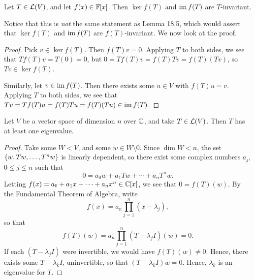 \documentclass{article}
\begin{document}
\begin{lemma}
Let $T\in\mathcal L(V)$, and let $f(x)\in \mathbb F[x]$. Then $\ker f(T)$ and $\operatorname{im} f(T)$ are $T$-invariant.
\end{lemma}
Notice that this is \textit{not} the same statement as Lemma 18.5, which would assert that $\ker f(T)$ and $\operatorname{im} f(T)$ are $f(T)$-invariant. We now look at the proof.
\begin{proof}
Pick $v\in\ker f(T)$. Then $f(T)v = 0$. Applying $T$ to both sides, we see that $Tf(T)v = T(0)= 0$, but $0=Tf(T)v = f(T)Tv = f(T)(Tv)$, so $Tv\in \ker f(T)$.

Similarly, let $v\in\operatorname{im} f(T)$. Then there exists some $u\in V$ with $f(T)u = v$. Applying $T$ to both sides, we see that $Tv = Tf(T)u = f(T)Tu = f(T)(Tu) \in \operatorname{im} f(T)$.
\end{proof}
\begin{theorem}
Let $V$ be a vector space of dimension $n$ over $\mathbb C$, and take $T\in\mathcal L(V)$. Then $T$ has at least one eigenvalue.
\end{theorem}
\begin{proof}
Take some $W<V$, and some $w\in W\setminus 0$. Since $\dim W < n$, the set $\left\{w, Tw, \ldots, T^nw\right\}$ is linearly dependent, so there exist some complex numbers $a_j$, $0\leq j\leq n$ such that
$$0 = a_0w + a_1Tw + \cdots + a_nT^nw.$$
Letting $f(x) = a_0 + a_1x + \cdots + a_nx^n \in \mathbb C[x]$, we see that $0 = f(T)(w)$. By the Fundamental Theorem of Algebra, write
$$f(x) = a_n\prod_{j=1}^n (x-\lambda_j),$$
so that
$$f(T)(w) = a_n\prod_{j=1}^n (T-\lambda_jI)(w) = 0.$$
If each $(T-\lambda_jI)$ were invertible, we would have $f(T)(w) \neq 0$. Hence, there exists some $T - \lambda_kI$, uninvertible, so that $(T-\lambda_kI)w = 0$. Hence, $\lambda_k$ is an eigenvalue for $T$.
\end{proof}
\end{document}
